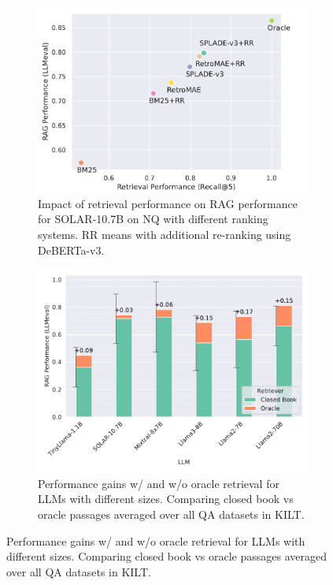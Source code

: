 \begin{figure}
	\centering
	\begin{subfigure}[b]{0.45\linewidth}
		\centering
		\includegraphics[width=\linewidth]{Figures/RAG_retrievalvsrag.pdf}
		\caption{Impact of retrieval performance on RAG performance for SOLAR-10.7B \cite{kim2024solar} on NQ with different ranking systems. RR means with additional re-ranking using DeBERTa-v3.}
		\label{fig:regencomp01}
	\end{subfigure}
	\hfill
	\begin{subfigure}[b]{0.45\linewidth}
		\centering
		\includegraphics[width=\linewidth]{Figures/RAG_gensize01.pdf}
		\caption{Performance gains w/ and w/o oracle retrieval for LLMs with different sizes. Comparing closed book vs oracle passages averaged over all QA datasets in KILT.}
		\label{fig:regencomp02}
	\end{subfigure}
	

\end{figure}

